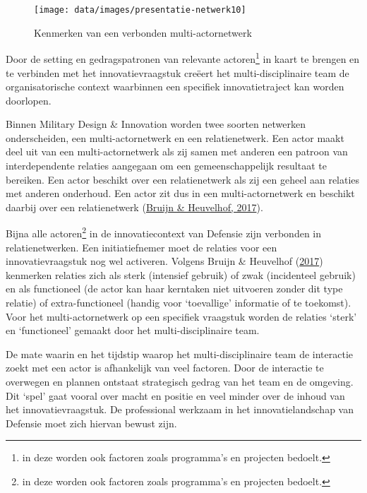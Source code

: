 \documentclass[
]{book}
\begin{document}
\begin{figure}

{\centering \texttt{[image: data/images/presentatie-netwerk10]} 

}

\caption{Kenmerken van een verbonden multi-actornetwerk}\label{fig:verbinding}
\end{figure}

Door de setting en gedragspatronen van relevante actoren\footnote{in deze worden ook factoren zoals programma's en projecten bedoelt.} in kaart te brengen en te verbinden met het innovatievraagstuk creëert het multi-disciplinaire team de organisatorische context waarbinnen een specifiek innovatietraject kan worden doorlopen.

Binnen Military Design \& Innovation worden twee soorten netwerken onderscheiden, een multi-actornetwerk en een relatienetwerk. Een actor maakt deel uit van een multi-actornetwerk als zij samen met anderen een patroon van interdependente relaties aangegaan om een gemeenschappelijk resultaat te bereiken. Een actor beschikt over een relatienetwerk als zij een geheel aan relaties met anderen onderhoud. Een actor zit dus in een multi-actornetwerk en beschikt daarbij over een relatienetwerk (\protect\hyperlink{ref-bruijn2017management}{Bruijn \& Heuvelhof, 2017}).

Bijna alle actoren\footnote{in deze worden ook factoren zoals programma's en projecten bedoelt.} in de innovatiecontext van Defensie zijn verbonden in relatienetwerken. Een initiatiefnemer moet de relaties voor een innovatievraagstuk nog wel activeren. Volgens Bruijn \& Heuvelhof (\protect\hyperlink{ref-bruijn2017management}{2017}) kenmerken relaties zich als sterk (intensief gebruik) of zwak (incidenteel gebruik) en als functioneel (de actor kan haar kerntaken niet uitvoeren zonder dit type relatie) of extra-functioneel (handig voor `toevallige' informatie of te toekomst). Voor het multi-actornetwerk op een specifiek vraagstuk worden de relaties `sterk' en `functioneel' gemaakt door het multi-disciplinaire team.

De mate waarin en het tijdstip waarop het multi-disciplinaire team de interactie zoekt met een actor is afhankelijk van veel factoren. Door de interactie te overwegen en plannen ontstaat strategisch gedrag van het team en de omgeving. Dit `spel' gaat vooral over macht en positie en veel minder over de inhoud van het innovatievraagstuk. De professional werkzaam in het innovatielandschap van Defensie moet zich hiervan bewust zijn.
\end{document}

